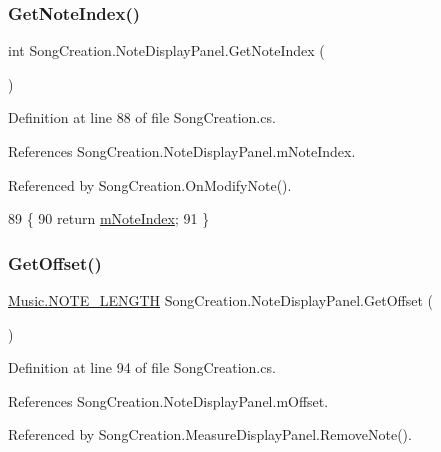 \subsubsection{\texorpdfstring{Get\+Note\+Index()}{GetNoteIndex()}}
{\footnotesize\ttfamily int Song\+Creation.\+Note\+Display\+Panel.\+Get\+Note\+Index (\begin{DoxyParamCaption}{ }\end{DoxyParamCaption})}



Definition at line 88 of file Song\+Creation.\+cs.



References Song\+Creation.\+Note\+Display\+Panel.\+m\+Note\+Index.



Referenced by Song\+Creation.\+On\+Modify\+Note().


\begin{DoxyCode}
89         \{
90             \textcolor{keywordflow}{return} \hyperlink{class_song_creation_1_1_note_display_panel_a383f4e592812c12028e0ff3f7aec0980}{mNoteIndex};
91         \}
\end{DoxyCode}
\mbox{\label{class_song_creation_1_1_note_display_panel_a804d1fc14c1ca14ebf5b37b122b1faf0}} 
\subsubsection{\texorpdfstring{Get\+Offset()}{GetOffset()}}
{\footnotesize\ttfamily \hyperlink{group___music_enums_gaf11b5f079adbb21c800b9eca1c5c3cbd}{Music.\+N\+O\+T\+E\+\_\+\+L\+E\+N\+G\+TH} Song\+Creation.\+Note\+Display\+Panel.\+Get\+Offset (\begin{DoxyParamCaption}{ }\end{DoxyParamCaption})}



Definition at line 94 of file Song\+Creation.\+cs.



References Song\+Creation.\+Note\+Display\+Panel.\+m\+Offset.



Referenced by Song\+Creation.\+Measure\+Display\+Panel.\+Remove\+Note().


